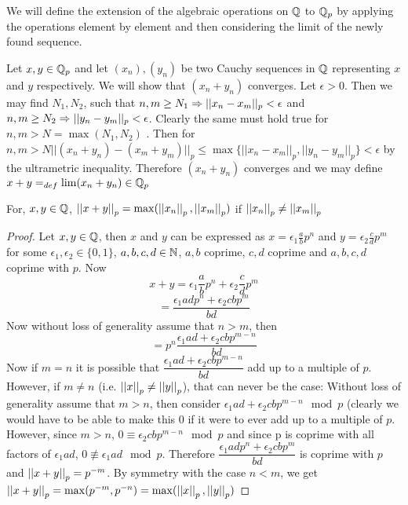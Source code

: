 \par 
We will define the extension of the algebraic operations on $\mathbb{Q}$ to $\mathbb{Q}_p$ by applying the operations element by element and then considering the limit of the newly found sequence. \par
{} Let $x,y\in \mathbb{Q}_p$ and let $(x_n), (y_n)$ be two Cauchy sequences in $\mathbb{Q}$ representing $x$ and $y$ respectively. We will show that $(x_n+y_n)$ converges. Let $\epsilon>0$. Then we may find $N_1, N_2$, such that $n,m \geq N_1 \Rightarrow ||x_n - x_m||_p < \epsilon$ and $n,m \geq N_2 \Rightarrow ||y_n - y_m||_p < \epsilon$. Clearly the same must hold true for $n,m>N=\max(N_1,N_2)$ . Then for $n,m>N ||(x_n + y_n) - (x_m + y_m)||_p \leq \max\{ ||x_n - x_m||_p, ||y_n - y_m||_p \} < \epsilon$ by the ultrametric inequality. Therefore $(x_n+y_n)$ converges and we may define $x+y=_{def}\lim (x_n+y_n) \in \mathbb{Q}_p$ \par
\begin{lemma}
For, $x,y \in \mathbb{Q}$, $\left|\left| x+y \right|\right|_p=\max(\left|\left| x_n \right|\right|_p,\left|\left| x_m \right|\right|_p)$ if $\left|\left| x_n \right|\right|_p \neq \left|\left| x_m \right|\right|_p$
\begin{proof}
Let $x,y \in \mathbb{Q}$, then $x$ and $y$ can be expressed as $x=\epsilon_1\frac{a}{b}p^n$ and $y=\epsilon_2\frac{c}{d}p^m$ for some $\epsilon_1,\epsilon_2\in \{0,1\}$, $a,b,c,d \in \mathbb{N}$, $a,b$ coprime, $c,d$ coprime and $a,b,c,d$ coprime with $p$. 
Now
\[x+y = \epsilon_1\frac{a}{b}p^n + \epsilon_2\frac{c}{d}p^m\]
\[ =\dfrac{\epsilon_1 a d p^n + \epsilon_2 c b p^m}{bd} \]
Now without loss of generality assume that $n>m$, then 
\[ = p^n\dfrac{\epsilon_1 a d + \epsilon_2 c b p^{m-n}}{bd} \]
Now if $m=n$ it is possible that $\dfrac{\epsilon_1 a d + \epsilon_2 c b p^{m-n}}{bd}$ add up to a multiple of $p$. However, if $m\neq n$ (i.e. $\left|\left| x \right|\right|_p\neq\left|\left| y \right|\right|_p$), that can never be the case: Without loss of generality assume that $m>n$,  then consider $\epsilon_1 a d + \epsilon_2 c b p^{m-n} \mod{p}$ (clearly we would have to be able to make this 0 if it were to ever add up to a multiple of $p$. However, since $m>n$,
$0\equiv \epsilon_2 c b p^{m-n} \mod{p}$ and since p is coprime with all factors of $\epsilon_1 a d$, $0\not\equiv \epsilon_1 a d \mod{p}$. Therefore $\dfrac{\epsilon_1 a d p^n + \epsilon_2 c b p^m}{bd}$ is coprime with $p$ and $\left|\left| x+y \right|\right|_p=p^{-m}$. By symmetry with the case $n<m$, we get 
$\left|\left| x+y \right|\right|_p=\max(p^{-m},p^{-n})=\max(\left|\left| x \right|\right|_p,\left|\left| y \right|\right|_p)$
\end{proof}
\end{lemma}

